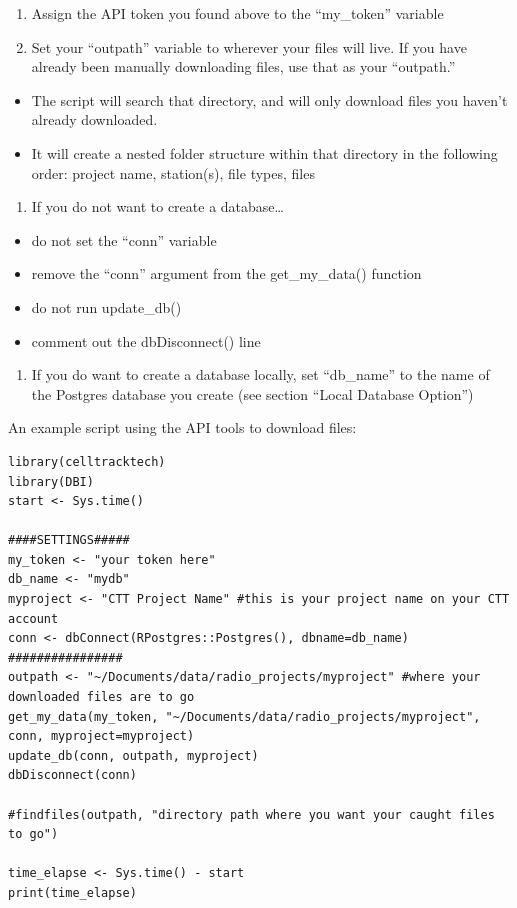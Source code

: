 \documentclass[
]{book}
\providecommand{\tightlist}{%
  \setlength{\itemsep}{0pt}\setlength{\parskip}{0pt}}
\begin{document}
\begin{enumerate}
\def\labelenumi{\arabic{enumi}.}
\tightlist
\item
  Assign the API token you found above to the ``my\_token'' variable
\item
  Set your ``outpath'' variable to wherever your files will live. If you have already been manually downloading files, use that as your ``outpath.''
\end{enumerate}

\begin{itemize}
\tightlist
\item
  The script will search that directory, and will only download files you haven't already downloaded.
\item
  It will create a nested folder structure within that directory in the following order: project name, station(s), file types, files
\end{itemize}

\begin{enumerate}
\def\labelenumi{\arabic{enumi}.}
\setcounter{enumi}{2}
\tightlist
\item
  If you do not want to create a database\ldots{}
\end{enumerate}

\begin{itemize}
\tightlist
\item
  do not set the ``conn'' variable
\item
  remove the ``conn'' argument from the get\_my\_data() function
\item
  do not run update\_db()
\item
  comment out the dbDisconnect() line
\end{itemize}

\begin{enumerate}
\def\labelenumi{\arabic{enumi}.}
\setcounter{enumi}{3}
\tightlist
\item
  If you do want to create a database locally, set ``db\_name'' to the name of the Postgres database you create (see section ``Local Database Option'')
\end{enumerate}

An example script using the API tools to download files:

\begin{verbatim}
library(celltracktech)
library(DBI)
start <- Sys.time()

####SETTINGS#####
my_token <- "your token here"
db_name <- "mydb"
myproject <- "CTT Project Name" #this is your project name on your CTT account
conn <- dbConnect(RPostgres::Postgres(), dbname=db_name)
################
outpath <- "~/Documents/data/radio_projects/myproject" #where your downloaded files are to go
get_my_data(my_token, "~/Documents/data/radio_projects/myproject", conn, myproject=myproject)
update_db(conn, outpath, myproject)
dbDisconnect(conn)

#findfiles(outpath, "directory path where you want your caught files to go")

time_elapse <- Sys.time() - start
print(time_elapse)
\end{verbatim}
\end{document}
